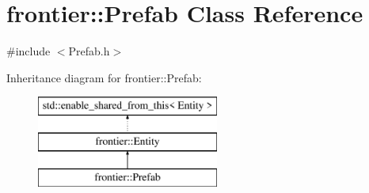 \hypertarget{classfrontier_1_1_prefab}{}\section{frontier\+:\+:Prefab Class Reference}
\label{classfrontier_1_1_prefab}


{\ttfamily \#include $<$Prefab.\+h$>$}

Inheritance diagram for frontier\+:\+:Prefab\+:\begin{figure}[H]
\begin{center}
\leavevmode
\includegraphics[height=3.000000cm]{classfrontier_1_1_prefab}
\end{center}
\end{figure}
